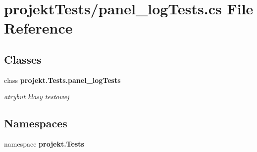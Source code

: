 \section{projekt\+Tests/panel\+\_\+log\+Tests.cs File Reference}
\label{panel__logTests_8cs}
\subsection*{Classes}
\begin{DoxyCompactItemize}
\item 
class \textbf{ projekt.\+Tests.\+panel\+\_\+log\+Tests}
\begin{DoxyCompactList}\small\item\em atrybut klasy testowej \end{DoxyCompactList}\end{DoxyCompactItemize}
\subsection*{Namespaces}
\begin{DoxyCompactItemize}
\item 
namespace \textbf{ projekt.\+Tests}
\end{DoxyCompactItemize}

